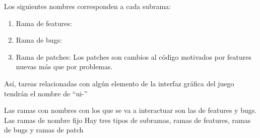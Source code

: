 Los siguientes nombres corresponden a cada subrama:
\begin{enumerate}
\item Rama de features: 
\item Rama de bugs: 
\item Rama de patches: 
Los patches son cambios al código motivados por features nuevas más que por problemas.
\end{enumerate}

Así, tareas relacionadas con algún elemento de la interfaz gráfica del juego tendrán el nombre de “ui-”

Las ramas con nombres con los que se va a interactuar son las de features y bugs.
Las ramas de nombre fijo
Hay tres tipos de subramas, ramas de features, ramas de bugs y ramas de patch
